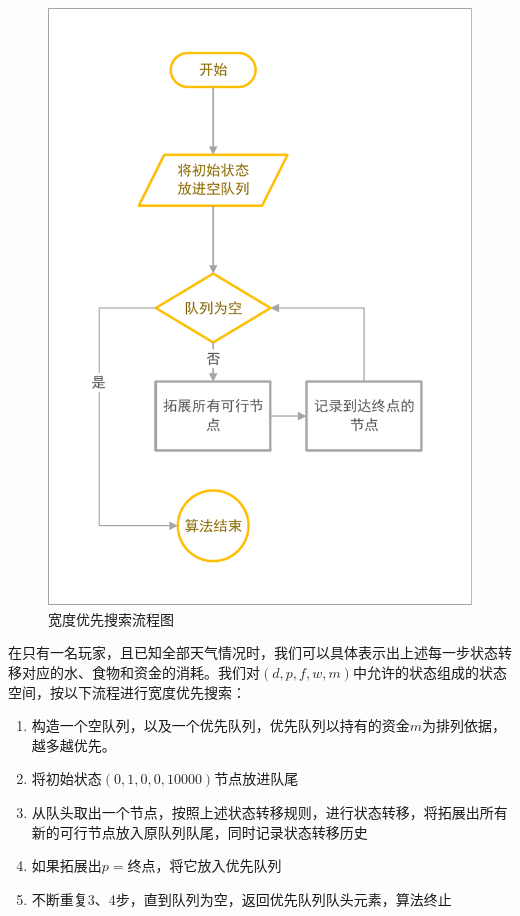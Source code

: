 \documentclass[withoutpreface,bwprint]{cumcmthesis} %
\begin{document}
\begin{figure}[!htbp]
    \centering
    \includegraphics[height=.5\paperheight]{figures/bfs.pdf}
    \caption{宽度优先搜索流程图}
    \label{bfs}
\end{figure}

在只有一名玩家，且已知全部天气情况时，我们可以具体表示出上述每一步状态转移对应的水、食物和资金的消耗。我们对\((d,p,f,w,m)\)中允许的状态组成的状态空间，按以下流程进行宽度优先搜索：
\begin{enumerate}
    \item 构造一个空队列，以及一个优先队列，优先队列以持有的资金\(m\)为排列依据，越多越优先。
    \item 将初始状态\((0,1,0,0,10000)\)节点放进队尾
    \item 从队头取出一个节点，按照上述状态转移规则，进行状态转移，将拓展出所有新的可行节点放入原队列队尾，同时记录状态转移历史
    \item 如果拓展出\(p=\)终点，将它放入优先队列
    \item 不断重复3、4步，直到队列为空，返回优先队列队头元素，算法终止
\end{enumerate}
\end{document}
